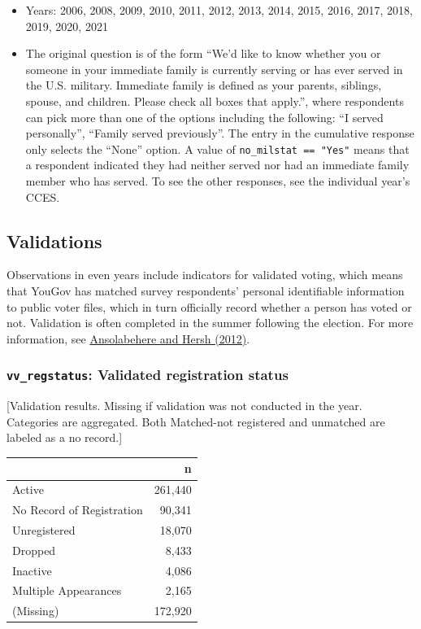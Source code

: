 \documentclass[10pt,article,oneside]{memoir}
\theoremstyle{definition}
\begin{document}
\begin{itemize}
\tightlist
\item
  Years: 2006, 2008, 2009, 2010, 2011, 2012, 2013, 2014, 2015, 2016,
  2017, 2018, 2019, 2020, 2021
\item
  The original question is of the form ``We'd like to know whether you
  or someone in your immediate family is currently serving or has ever
  served in the U.S. military. Immediate family is defined as your
  parents, siblings, spouse, and children. Please check all boxes that
  apply.'', where respondents can pick more than one of the options
  including the following: ``I served personally'', ``Family served
  previously''. The entry in the cumulative response only selects the
  ``None'' option. A value of \texttt{no\_milstat\ ==\ "Yes"} means that
  a respondent indicated they had neither served nor had an immediate
  family member who has served. To see the other responses, see the
  individual year's CCES.
\end{itemize}

\newpage

\hypertarget{validations}{%
\subsection{Validations}\label{validations}}

Observations in even years include indicators for validated voting,
which means that YouGov has matched survey respondents' personal
identifiable information to public voter files, which in turn officially
record whether a person has voted or not. Validation is often completed
in the summer following the election. For more information, see
\href{https://doi.org/10.1093/pan/mps023}{Ansolabehere and Hersh
(2012)}.

\hypertarget{vv_regstatus-validated-registration-status}{%
\subsubsection{\texorpdfstring{\texttt{vv\_regstatus}: Validated
registration
status}{vv\_regstatus: Validated registration status}}\label{vv_regstatus-validated-registration-status}}

{[}Validation results. Missing if validation was not conducted in the
year. Categories are aggregated. Both Matched-not registered and
unmatched are labeled as a no record.{]}

\begin{table}[H]
\centering
\begin{tabular}[t]{lr}
\toprule
 & n\\
\midrule
Active & 261,440\\
No Record of Registration & 90,341\\
Unregistered & 18,070\\
Dropped & 8,433\\
Inactive & 4,086\\
Multiple Appearances & 2,165\\
(Missing) & 172,920\\
\bottomrule
\end{tabular}
\end{table}
\end{document}
